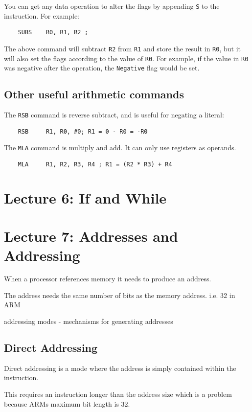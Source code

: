 \documentclass{article}
\begin{document}
You can get any data operation to alter the flags by appending {\tt S} to the instruction. For example:

\begin{verbatim}
	SUBS	R0, R1, R2 ;
\end{verbatim}

The above command will subtract {\tt R2} from {\tt R1} and store the result in {\tt R0}, but it will also set the flags according to the value of {\tt R0}. For example, if the value in {\tt R0} was negative after the operation, the {\tt Negative} flag would be set.

\subsection{Other useful arithmetic commands}

The {\tt RSB} command is reverse subtract, and is useful for negating a literal:

\begin{verbatim}
	RSB 	R1, R0, #0; R1 = 0 - R0 = -R0
\end{verbatim}

The {\tt MLA} command is multiply and add. It can only use registers as operands.

\begin{verbatim}
	MLA 	R1, R2, R3, R4 ; R1 = (R2 * R3) + R4
\end{verbatim}

\section{Lecture 6: If and While}

\section{Lecture 7: Addresses and Addressing}
When a processor references memory it needs to produce an address.

The address needs the same number of bits as the memory address. i.e. 32 in ARM

addressing modes - mechanisms for generating addresses

\subsection{Direct Addressing}
Direct addressing is a mode where the address is simply contained within the instruction.

This requires an instruction longer than the address size which is a problem because ARMs maximum bit length is 32.
\end{document}

